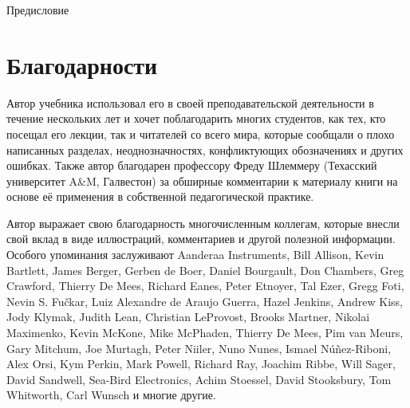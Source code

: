 \begin{chapter}{Предисловие}
\section*{Благодарности}
Автор учебника использовал его в своей преподавательской деятельности в
течение нескольких лет и хочет поблагодарить многих студентов, как
тех, кто посещал его лекции, так и читателей со всего мира, которые
сообщали о плохо написанных разделах, неоднозначностях, конфликтующих
обозначениях и других ошибках.
Также автор благодарен профессору Фреду Шлеммеру (Техасский
университет A\&M, Галвестон) за обширные комментарии к материалу книги
на основе её применения в собственной педагогической практике.

Автор выражает свою благодарность многочисленным коллегам, которые
внесли свой вклад в виде иллюстраций, комментариев и другой полезной
информации. Особого упоминания заслуживают Aanderaa Instruments, Bill
Allison, Kevin Bartlett, James Berger, Gerben de Boer, Daniel
Bourgault, Don Chambers, Greg Crawford, Thierry De Mees, Richard
Eanes, Peter Etnoyer, Tal Ezer, Gregg Foti, Nevin S. Fu\v{c}kar, Luiz
Alexandre de Araujo Guerra, Hazel Jenkins, Andrew Kiss, Jody Klymak,
Judith Lean, Christian LeProvost, Brooks Martner, Nikolai Maximenko,
Kevin McKone, Mike McPhaden, Thierry De Mees, Pim van Meurs, Gary
Mitchum, Joe Murtagh, Peter Niiler, Nuno Nunes, Ismael
N\'{u}\~{n}ez-Riboni, Alex Orsi, Kym Perkin, Mark Powell, Richard Ray,
Joachim Ribbe, Will Sager, David Sandwell, Sea-Bird Electronics, Achim
Stoessel, David Stooksbury, Tom Whitworth, Carl Wunsch и многие
другие.


\end{chapter}
